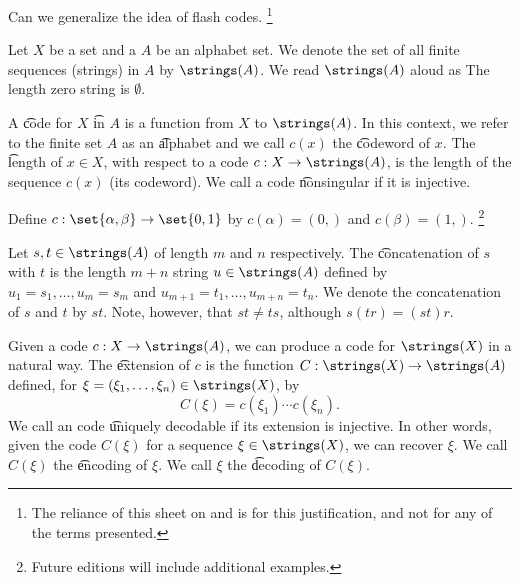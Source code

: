 

Can we generalize the idea of flash codes.
  \ifhmode\unskip\fi\footnote{
The reliance of this sheet on  and  is for this justification, and not for any of the terms presented.
  }


Let $X$ be a set and a $A$ be an alphabet set.
We denote the set of all finite sequences (strings) in $A$ by $\strings(A)$.
We read $\strings(A)$ aloud as 
The length zero string is $\emptyset$.

A \t{code} for $X$ \t{in} $A$ is a function from $X$ to $\strings(A)$.
In this context, we refer to the finite set $A$ as an \t{alphabet} and we call $c(x)$ the \t{codeword} of $x$.
The \t{length} of $x \in X$, with respect to a code $c: X \to \strings(A)$, is the length of the sequence $c(x)$ (its codeword).
We call a code \t{nonsingular} if it is injective.


Define $c: \set{\alpha, \beta} \to \set{0, 1}$ by $c(\alpha) = (0,)$ and $c(\beta) = (1,)$.
  \ifhmode\unskip\fi\footnote{
Future editions will include additional examples.
  }



Let $s,t \in \strings(A)$ of length $m$ and $n$ respectively.
The \t{concatenation} of $s$ with $t$ is the length $m+n$ string $u \in \strings(A)$ defined by $u_{1} = s_1, \dots, u_m = s_m$ and $u_{m+1} = t_1, \dots, u_{m+n} = t_n$.
We denote the concatenation of $s$ and $t$ by $st$.
Note, however, that $st \neq ts$, although $s(tr) = (st)r$.

Given a code $c: X \to \strings(A)$, we can produce a code for $\strings(X)$ in a natural way.
The \t{extension} of $c$ is the function $C: \strings(X) \to \strings(A)$ defined, for $\xi = (\xi_1, \dots, \xi_n) \in \strings(X)$, by
  \[
C(\xi) = c(\xi_1) \cdots c(\xi_n).
  \]
We call an code \t{uniquely decodable} if its extension is injective.
In other words, given the code $C(\xi)$ for a sequence $\xi \in \strings(X)$, we can recover $\xi$.
We call $C(\xi)$ the \t{encoding} of $\xi$.
We call $\xi$ the \t{decoding} of $C(\xi)$.
